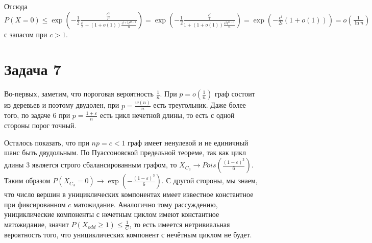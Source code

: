 \documentclass{article}
\theoremstyle{definition}
\theoremstyle{remark}
\renewcommand{\le}{\leqslant}
\renewcommand{\ge}{\geqslant}
\newcommand{\eps}{\varepsilon}
\begin{document}
Отсюда $P(X = 0) \le \exp\left(-\frac{1}{2} \frac{\frac{c^{2l}}{l^2}}{\frac{c^l}{l} + (1 + o(1))
\frac{c^{l+2} l^{2l-2}}{n}} \right) =
\exp\left(-\frac{1}{2} \frac{\frac{c^l}{l}}{1 + (1 + o(1)) \frac{c^2 l^{2l-1} }{n}}\right) =
\exp\left( -\frac{c^l}{2l} (1 + o(1)) \right) = o\left(\frac{1}{\ln n}\right)$ с запасом при $c >
1$.

\section*{Задача 7}

Во-первых, заметим, что пороговая вероятность $\frac{1}{n}$. При $p = o\left(\frac{1}{n}\right)$
граф состоит из деревьев и поэтому двудолен, при $p = \frac{w(n)}{n}$ есть треугольник. Даже более
того, по задаче 6 при $p = \frac{1 + \eps}{n}$ есть цикл нечетной длины, то есть с одной стороны
порог точный.

Осталось показать, что при $np = c < 1$ граф имеет ненулевой и не единичный шанс быть двудольным. По
Пуассоновской предельной теореме, так как цикл длины 3 является строго сбалансированным графом, то
$X_{C_3} \rightarrow Pois\left(\frac{(1-\eps)^3}{6}\right)$. Таким образом $P(X_{C_3} = 0)
\rightarrow \exp\left(-\frac{(1-\eps)^3}{6}\right)$. С другой стороны, мы знаем, что число вершин в
унициклических компонентах имеет известное константное при фиксированном $c$ матожидание.
Аналогично тому рассуждению, унициклические компоненты с нечетным циклом имеют константное
матожидание, значит $P(X_{odd} \ge 1) \le \frac{1}{C}$, то есть имеется нетривиальная вероятность
того, что унициклических компонент с нечётным циклом не будет.
\end{document}
